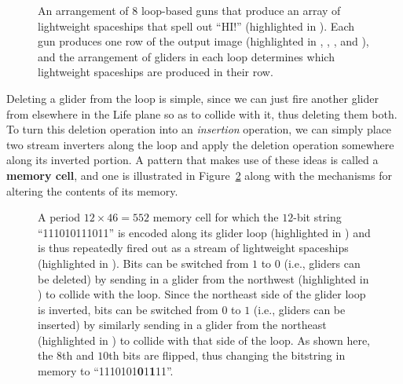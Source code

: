 \begin{figure}[!htb]
	\centering
	\caption{An arrangement of $8$ loop-based guns that produce an array of lightweight spaceships that spell out ``HI!'' (highlighted in ). Each gun produces one row of the output image (highlighted in , , , and ), and the arrangement of gliders in each loop determines which lightweight spaceships are produced in their row.}\label{fig:ticker_tape_hi_gun}
\end{figure}

Deleting a glider from the loop is simple, since we can just fire another glider from elsewhere in the Life plane so as to collide with it, thus deleting them both. To turn this deletion operation into an \emph{insertion} operation, we can simply place two stream inverters along the loop and apply the deletion operation somewhere along its inverted portion. A pattern that makes use of these ideas is called a \textbf{memory cell}, and one is illustrated in Figure~\ref{fig:p46_memory_cell} along with the mechanisms for altering the contents of its memory.

\begin{figure}[!htb]
	\centering
	\caption{A period $12 \times 46 = 552$ memory cell for which the $12$-bit string ``111010111011'' is encoded along its glider loop (highlighted in ) and is thus repeatedly fired out as a stream of lightweight spaceships (highlighted in ). Bits can be switched from $1$ to $0$ (i.e., gliders can be deleted) by sending in a glider from the northwest (highlighted in ) to collide with the loop. Since the northeast side of the glider loop is inverted, bits can be switched from $0$ to $1$ (i.e., gliders can be inserted) by similarly sending in a glider from the northeast (highlighted in ) to collide with that side of the loop. As shown here, the $8$th and $10$th bits are flipped, thus changing the bitstring in memory to ``1110101\textbf{0}1\textbf{1}11''.}\label{fig:p46_memory_cell}
\end{figure}


